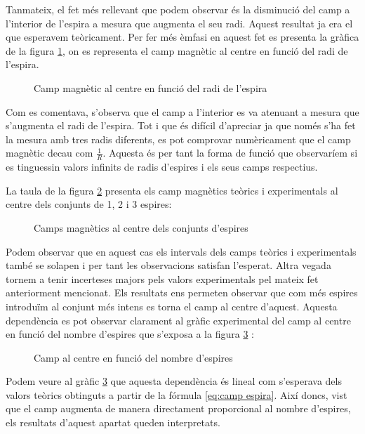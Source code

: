 Tanmateix, el fet més rellevant que podem observar és la disminució del camp a l'interior de l'espira a mesura que augmenta el seu radi. Aquest resultat ja era el que esperavem teòricament. Per fer més èmfasi en aquest fet es presenta la gràfica de la figura \cref{fig:camp espira}, on es representa el camp magnètic al centre en funció del radi de l'espira.
\begin{figure}[htb]
  \centering
  \caption{Camp magnètic al centre en funció del radi de l'espira}
  \label{fig:camp espira}
\end{figure}

Com es comentava, s'observa que el camp a l'interior es va  atenuant a mesura que s'augmenta el radi de l'espira. Tot i que és difícil d'apreciar ja que només s'ha fet la mesura amb tres radis diferents, es pot comprovar numèricament que el camp magnètic decau com \(\frac{1}{R}\). Aquesta és per tant la forma de funció que observaríem si es tinguessin valors infinits de radis d'espires i els seus camps respectius.

La taula de la figura \cref{fig:camp centre espires} presenta els camp magnètics teòrics i experimentals al centre dels conjunts de 1, 2 i 3 espires:

\begin{figure}[htb]
  \centering
  \caption{Camps magnètics al centre dels conjunts d'espires}
  \label{fig:camp centre espires}
\end{figure}
Podem observar que en aquest cas els intervals dels camps teòrics i experimentals també se solapen i per tant les observacions satisfan l'esperat. Altra vegada tornem a tenir incerteses majors pels valors experimentals pel mateix fet anteriorment mencionat. Els resultats ens permeten observar que com més espires introduïm al conjunt més intens es torna el camp al centre d'aquest. Aquesta dependència es pot observar clarament al gràfic experimental del camp al centre en funció del nombre d'espires que s'exposa a la figura \cref{fig:camp vs n} :

\begin{figure}[htb]
  \centering
  \caption{Camp al centre en funció del nombre d'espires}
  \label{fig:camp vs n}
\end{figure}

Podem veure al gràfic \cref{fig:camp vs n} que aquesta dependència és lineal com s'esperava dels valors teòrics obtinguts a partir de la fórmula \cref{eq:camp espira}. Així doncs, vist que el camp augmenta de manera directament proporcional al nombre d'espires, els resultats d'aquest apartat queden interpretats.

